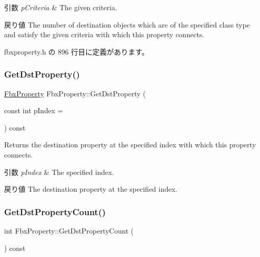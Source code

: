 \begin{DoxyParams}{引数}
{\em p\+Criteria} & The given criteria. \\
\hline
\end{DoxyParams}
\begin{DoxyReturn}{戻り値}
The number of destination objects which are of the specified class type and satisfy the given criteria with which this property connects. 
\end{DoxyReturn}


 fbxproperty.\+h の 896 行目に定義があります。

\mbox{\label{class_fbx_property_ade7a6b86edce76764b6b4cb4854cb9b7}} 
\subsubsection{\texorpdfstring{Get\+Dst\+Property()}{GetDstProperty()}}
{\footnotesize\ttfamily \hyperlink{class_fbx_property}{Fbx\+Property} Fbx\+Property\+::\+Get\+Dst\+Property (\begin{DoxyParamCaption}\item[{const int}]{p\+Index = {} }\end{DoxyParamCaption}) const}

Returns the destination property at the specified index with which this property connects. 
\begin{DoxyParams}{引数}
{\em p\+Index} & The specified index. \\
\hline
\end{DoxyParams}
\begin{DoxyReturn}{戻り値}
The destination property at the specified index. 
\end{DoxyReturn}
\mbox{\label{class_fbx_property_abfcc52bdbd9853b10806740934b0230a}} 
\subsubsection{\texorpdfstring{Get\+Dst\+Property\+Count()}{GetDstPropertyCount()}}
{\footnotesize\ttfamily int Fbx\+Property\+::\+Get\+Dst\+Property\+Count (\begin{DoxyParamCaption}{ }\end{DoxyParamCaption}) const}

